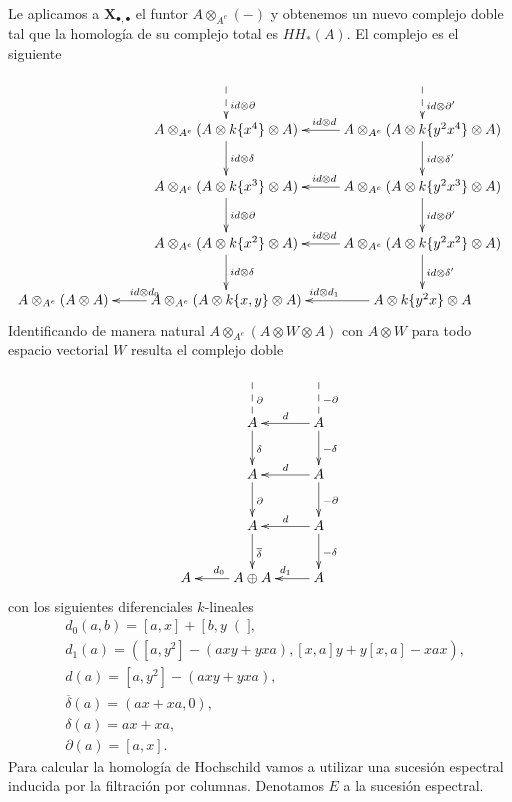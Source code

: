 \documentclass[a4paper,oneside,fleqn,11pt]{article}
\newcommand\ox{\otimes}
\numberwithin{prop}{subsection}
\begin{document}
Le aplicamos a $\mathbf{X}_{\bullet,\bullet}$ el funtor $A \ox_{A^e}(-)$ y obtenemos un nuevo
complejo doble tal que la homología de su complejo total es $HH_*(A)$. El complejo es el siguiente
\begin{align*}
\xymatrix{
	& & \\
	& A \ox_{A^e} (A \ox k\{x^4\} \ox A) \ar[d]^{id\ox\delta} \ar@{<--}[u]_{id\ox\partial}
		& A \ox_{A^e} (A \ox k\{y^2x^4\} \ox A) \ar[l]_{id\ox d} \ar[d]^{id\ox\delta'} \ar@{<--}[u]_{id\ox\partial'} \\
	& A \ox_{A^e} (A \ox k\{x^3\} \ox A) \ar[d]^{id\ox\partial}
		& A \ox_{A^e} (A \ox k\{y^2x^3\} \ox A) \ar[l]_{id\ox d} \ar[d]^{id\ox\partial'} \\
	& A \ox_{A^e} (A \ox k\{x^2\} \ox A) \ar[d]^{id\ox\delta}
		& A \ox_{A^e} (A \ox k \{y^2x^2\} \ox A) \ar[l]_{id\ox d} \ar[d]^{id\ox\delta'} \\
	A \ox_{A^e} (A \ox A) & A \ox_{A^e} (A \ox k\{x, y\} \ox A) \ar[l]_{id\ox d_0} & A \ox k \{y^2x\} \ox A \ar[l]_{id\ox d_1} \\
}
\end{align*}
Identificando de manera natural $A \ox_{A^e} (A \ox W \ox A)$ con $A \ox W$ para todo espacio vectorial $W$ resulta
el complejo doble
\begin{align*}
\xymatrix{
	& & \\
	& A \ar[d]^{\delta} \ar@{--}[u]_{\partial} & A\ar[l]_{d} \ar[d]^{-\delta} \ar@{--}[u]_{-\partial} \\
	& A \ar[d]^{\partial} & A \ar[l]_{d} \ar[d]^{-\partial} \\
	& A \ar[d]^{\overline{\delta}} & A \ar[l]_{d} \ar[d]^{-\delta} \\
	A & A \oplus A \ar[l]_{d_0} & A \ar[l]_{d_1} \\
}
\end{align*}
con los siguientes diferenciales $k$-lineales
\begin{align*}
&d_0(a,b) = \left[a,x\right] + \left[b,y\right(],\\
&d_1(a) = (\left[a,y^2\right] - (axy + yxa), \left[x,a\right]y + y\left[x,a\right] - xax),\\
&d(a) = \left[a,y^2\right] - (axy + yxa),\\
&\overline{\delta}(a) = (ax + xa, 0),\\
&\delta(a) = ax + xa,\\
&\partial(a) = \left[a, x\right].
\end{align*}
Para calcular la homología de Hochschild vamos a utilizar una sucesión espectral inducida por la filtración por columnas.
Denotamos $E$ a la sucesión espectral.
\end{document}
